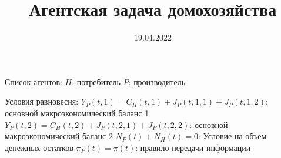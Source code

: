 \documentclass[12pt]{article}
\title{Агентская задача домохозяйства}
\date{19.04.2022}
\begin{document}
Список агентов:
    $H$: потребитель
    $P$: производитель

Условия равновесия:
    $Y_{P}(t, 1) = C_{H}(t, 1) + J_{P}(t,1,1) + J_{P}(t,1,2)$: основной макроэкономический баланс 1
    $Y_{P}(t, 2) = C_{H}(t, 2) + J_{P}(t,2,1) + J_{P}(t,2,2)$: основной макроэкономический баланс 2
    $N_{P}(t) + N_{H}(t) = 0$: Условие на объем денежных остатков
    $\pi_{P}(t) = \pi(t)$: правило передачи информации
\end{document}
